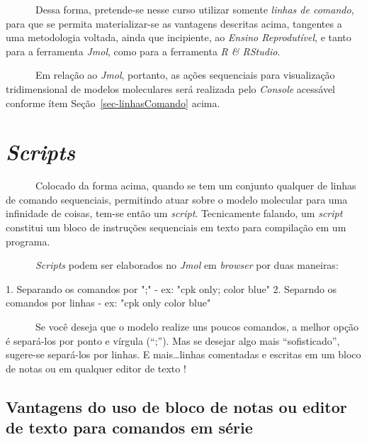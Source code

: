 \documentclass[
  letterpaper,
  DIV=11,
  numbers=noendperiod]{scrreprt}
\newenvironment{Shaded}{\begin{snugshade}}{\end{snugshade}}
\newcommand{\FloatTok}[1]{\textcolor[rgb]{0.68,0.00,0.00}{#1}}
\newcommand{\NormalTok}[1]{\textcolor[rgb]{0.00,0.23,0.31}{#1}}
\newcommand{\SpecialCharTok}[1]{\textcolor[rgb]{0.37,0.37,0.37}{#1}}
\newcommand{\StringTok}[1]{\textcolor[rgb]{0.13,0.47,0.30}{#1}}
\begin{document}
~~~~~~Dessa forma, pretende-se nesse curso utilizar somente \emph{linhas
de comando}, para que se permita materializar-se as vantagens descritas
acima, tangentes a uma metodologia voltada, ainda que incipiente, ao
\emph{Ensino Reprodutível}, e tanto para a ferramenta \emph{Jmol}, como
para a ferramenta \emph{R \& RStudio}.

~~~~~~Em relação ao \emph{Jmol}, portanto, as ações sequenciais para
visualização tridimensional de modelos moleculares será realizada pelo
\emph{Console} acessável conforme ítem Seção~\ref{sec-linhasComando}
acima.

\section{\texorpdfstring{\emph{Scripts}}{Scripts}}\label{scripts}

~~~~~~Colocado da forma acima, quando se tem um conjunto qualquer de
linhas de comando sequenciais, permitindo atuar sobre o modelo molecular
para uma infinidade de coisas, tem-se então um \emph{script}.
Tecnicamente falando, um \emph{script} constitui um bloco de instruções
sequenciais em texto para compilação em um programa.

~~~~~~\emph{Scripts} podem ser elaborados no \emph{Jmol} em
\emph{browser} por duas maneiras:

\begin{Shaded}
\begin{Highlighting}[]
\FloatTok{1.}\NormalTok{ Separando os comandos por }\StringTok{";"} \SpecialCharTok{{-}}\NormalTok{ ex}\SpecialCharTok{:} \StringTok{"cpk only; color blue"}
\FloatTok{2.}\NormalTok{ Separndo os comandos por linhas }\SpecialCharTok{{-}}\NormalTok{ ex}\SpecialCharTok{:}
                                   \StringTok{"cpk only}
\StringTok{                                    color blue"}
\end{Highlighting}
\end{Shaded}

~~~~~~Se você deseja que o modelo realize uns poucos comandos, a melhor
opção é separá-los por ponto e vírgula (``;''). Mas se desejar algo mais
``sofisticado'', sugere-se separá-los por linhas. E mais\ldots linhas
comentadas e escritas em um bloco de notas ou em qualquer editor de
texto !

\subsection{Vantagens do uso de bloco de notas ou editor de texto para
comandos em
série}\label{vantagens-do-uso-de-bloco-de-notas-ou-editor-de-texto-para-comandos-em-suxe9rie}
\end{document}
